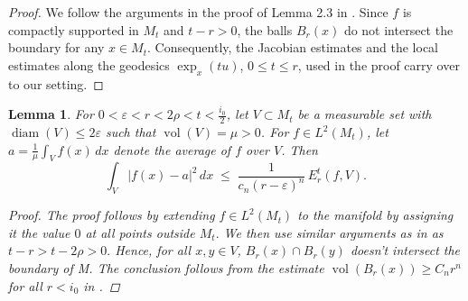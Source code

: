 \documentclass[10 pt, reqno]{amsart}
\newtheorem{lemma}[theorem]{Lemma}
\theoremstyle{definition}
\numberwithin{equation}{section}
\begin{document}
\begin{proof}
 We follow the arguments in the proof of Lemma 2.3 in \cite{MaityBhattacharya2026}. Since $f$ is compactly supported in $M_t$ and $t-r>0$, the balls $B_r(x)$ do not intersect the boundary for any $x\in M_t$. Consequently, the Jacobian estimates and the local estimates along the geodesics $\exp_x(tu)$, $0\le t\le r$, used in the proof carry over to our setting.
\end{proof}
\begin{lemma}
\label{lem:poincare-Mrho}
For $0<\varepsilon<r<2\rho<t<\frac{i_0}{2}$,  let $V\subset M_{t}$ be a measurable set with $\operatorname{diam}(V)\le 2\varepsilon$ such that  $\operatorname{vol}(V)=\mu>0$. For $f\in L^2(M_t)$, let $a = \frac{1}{\mu}\int_V f(x)\,dx$ denote the average of $f$ over $V$.
Then 
\[
\int_V |f(x)-a|^2\,dx
\;\le\;
 \frac{1}{c_n(r-\varepsilon)^{n}}\,
E_r^t(f,V).
\]
\begin{proof}
    The proof follows by extending $f\in L^2(M_t)$ to the manifold by assigning it the value $0$ at all points outside $M_t.$ We then use similar arguments as in \cite{burago} as $t-r>t-2\rho>0.$ Hence, for all $x,y\in V$, $B_r(x)\cap B_r(y)$ doesn't intersect the boundary of M. The conclusion follows from the estimate $\operatorname{vol}(B_r(x))\ge C_nr^n$ for all $r<i_0$ in \cite{MR448253berger}.
\end{proof}
\end{lemma}
\end{document}
